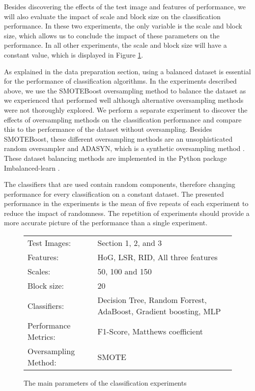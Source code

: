 Besides discovering the effects of the test image and features of performance, we will also evaluate the impact of scale and block size on the classification performance. In these two experiments, the only variable is the scale and block size, which allows us to conclude the impact of these parameters on the performance. In all other experiments, the scale and block size will have a constant value, which is displayed in Figure \ref{fig:params}.

As explained in the data preparation section, using a balanced dataset is essential for the performance of classification algorithms. In the experiments described above, we use the SMOTEBoost oversampling method to balance the dataset as we experienced that performed well although alternative oversampling methods were not thoroughly explored.  We perform a separate experiment to discover the effects of oversampling methods on the classification performance and compare this to the performance of the dataset without oversampling. Besides SMOTEBoost, these different oversampling methods are an unsophisticated random oversampler and ADASYN, which is a synthetic oversampling method \cite{he2008adasyn}. These dataset balancing methods are implemented in the Python package Imbalanced-learn \cite{lemaitre2017imbalanced}.

The classifiers that are used contain random components, therefore changing performance for every classification on a constant dataset. The presented performance in the experiments is the mean of five repeats of each experiment to reduce the impact of randomness. The repetition of experiments should provide a more accurate picture of the performance than a single experiment.

\begin{figure}
	\centering
	\begin{tabular}{|ll|}
		\hline
		Test Images: & Section 1, 2, and 3 \\
		Features: & HoG, LSR, RID, All three features\\
		Scales: & 50, 100 and 150 \\
		Block size: & 20\\
		Classifiers: & Decision Tree, Random Forrest, AdaBoost, Gradient boosting, MLP \\
		Performance Metrics: & F1-Score, Matthews coefficient\\
		Oversampling Method: & SMOTE\\
		\hline
	\end{tabular}
	\caption{The main parameters of the classification experiments}
	\label{fig:params}
\end{figure}

